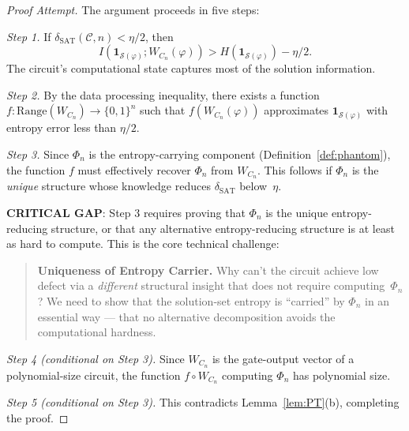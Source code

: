 \documentclass[11pt]{article}
\theoremstyle{definition}
\theoremstyle{remark}
\newcommand{\calC}{\mathcal{C}}
\newcommand{\calS}{\mathcal{S}}
\newcommand{\dSAT}{\delta_{\mathrm{SAT}}}
\begin{document}
\begin{proof}[Proof Attempt]
The argument proceeds in five steps:

\emph{Step 1.}  If $\dSAT(\calC, n) < \eta/2$, then
\[
  I(\mathbf{1}_{\calS(\varphi)} ; W_{C_n}(\varphi)) >
  H(\mathbf{1}_{\calS(\varphi)}) - \eta/2.
\]
The circuit's computational state captures most of the solution information.

\emph{Step 2.}  By the data processing inequality, there exists a function
$f: \mathrm{Range}(W_{C_n}) \to \{0,1\}^n$ such that $f(W_{C_n}(\varphi))$
approximates $\mathbf{1}_{\calS(\varphi)}$ with entropy error less than $\eta/2$.

\emph{Step 3.}  Since $\Phi_n$ is the entropy-carrying component
(Definition~\ref{def:phantom}), the function $f$ must effectively recover
$\Phi_n$ from $W_{C_n}$.  This follows if $\Phi_n$ is the \emph{unique}
structure whose knowledge reduces $\dSAT$ below~$\eta$.

\textbf{CRITICAL GAP}: Step 3 requires proving that $\Phi_n$ is the unique
entropy-reducing structure, or that any alternative entropy-reducing structure
is at least as hard to compute.  This is the core technical challenge:

\begin{quote}
\textbf{Uniqueness of Entropy Carrier.}  Why can't the circuit achieve low
defect via a \emph{different} structural insight that does not require
computing~$\Phi_n$?  We need to show that the solution-set entropy is
``carried'' by $\Phi_n$ in an essential way --- that no alternative
decomposition avoids the computational hardness.
\end{quote}

\emph{Step 4 (conditional on Step 3).}  Since $W_{C_n}$ is the gate-output
vector of a polynomial-size circuit, the function $f \circ W_{C_n}$ computing
$\Phi_n$ has polynomial size.

\emph{Step 5 (conditional on Step 3).}  This contradicts
Lemma~\ref{lem:PT}(b), completing the proof.
\end{proof}
\end{document}
